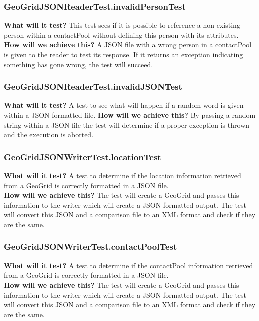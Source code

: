 \documentclass{article}
\begin{document}
\subsubsection{GeoGridJSONReaderTest.invalidPersonTest}
\textbf{What will it test?}
This test sees if it is possible to reference a non-existing person within a contactPool without defining this person with its attributes. 
\newline
\textbf{How will we achieve this?}
A JSON file with a wrong person in a contactPool is given to the reader to test its response. If it returns an exception indicating something has gone wrong, the test will succeed.

\subsubsection{GeoGridJSONReaderTest.invalidJSONTest}
\textbf{What will it test?}
A test to see what will happen if a random word is given within a JSON formatted file.
\newline
\textbf{How will we achieve this?}
By passing a random string within a JSON file the test will determine if a proper exception is thrown and the execution is aborted.

\subsubsection{GeoGridJSONWriterTest.locationTest}
\textbf{What will it test?}
A test to determine if the location information retrieved from a GeoGrid is correctly formatted in a JSON file. \\
\newline
\textbf{How will we achieve this?}
The test will create a GeoGrid and passes this information to the writer which will create a JSON formatted output. The test will convert this JSON and a comparison file to an XML format and check if they are the same.

\subsubsection{GeoGridJSONWriterTest.contactPoolTest}
\textbf{What will it test?}
A test to determine if the contactPool information retrieved from a GeoGrid is correctly formatted in a JSON file.\\
\newline
\textbf{How will we achieve this?}
The test will create a GeoGrid and passes this information to the writer which will create a JSON formatted output. The test will convert this JSON and a comparison file to an XML format and check if they are the same.
\end{document}
